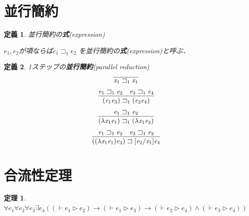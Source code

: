 \documentclass{ltjsbook}%
\newtheorem{theorem}{定理}[section]%
\newtheorem{definition}{定義}[section]%
\newcommand\term[2]{\textbf{#1}{(\textit{#2})}}%
\begin{document}
\section{並行簡約}%
\label{sect:par}%
\begin{definition}%
並行簡約の\term{式}{expression}%
\par$\mathit{e}_1,\mathit{e}_2$が項ならば$\mathit{e}_1\sqsupset_1\mathit{e}_2$%
を並行簡約の\term{式}{expression}と呼ぶ．%
\end{definition}%
\begin{definition}%
1ステップの\term{並行簡約}{parallel reduction}%
\begin{equation}%
  \infer{%
    \mathit{x}_1\sqsupset_1\mathit{x}_1%
  }{%
  }%
\end{equation}%
\begin{equation}%
  \infer{%
    (\mathit{e}_1\mathit{e}_3)\sqsupset_1(\mathit{e}_2\mathit{e}_4)%
  }{%
    \mathit{e}_1\sqsupset_1\mathit{e}_2%
  &%
    \mathit{e}_3\sqsupset_1\mathit{e}_4%
  }%
\end{equation}%
\begin{equation}%
  \infer{%
    (\lambda\mathit{x}_1\mathit{e}_1)\sqsupset_1%
    (\lambda\mathit{x}_1\mathit{e}_2)%
  }{%
    \mathit{e}_1\sqsupset_1\mathit{e}_2%
  }%
\end{equation}%
\begin{equation}%
  \infer{%
    ((\lambda\mathit{x}_1\mathit{e}_1)\mathit{e}_3)\sqsupset%
    [\mathit{e}_2/\mathit{x}_1]\mathit{e}_4%
  }{%
    \mathit{e}_1\sqsupset_1\mathit{e}_2%
  &%
    \mathit{e}_3\sqsupset_1\mathit{e}_2%
  }%
\end{equation}%
\end{definition}%
\section{合流性定理}%
\label{sect:cr}%
\begin{theorem}%
  $\forall\mathit{e}_1\forall\mathit{e}_2\forall\mathit{e}_3\exists\mathit{e}_4%
  ((\vdash\mathit{e}_1\triangleright\mathit{e}_2)\rightarrow%
  (\vdash\mathit{e}_1\triangleright\mathit{e}_3)\rightarrow%
  (\vdash\mathit{e}_2\triangleright\mathit{e}_4)\land%
  (\vdash\mathit{e}_3\triangleright\mathit{e}_4))$%
\end{theorem}%
\backmatter%
\end{document}

